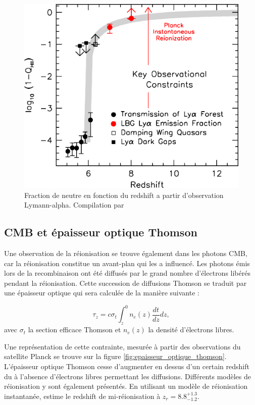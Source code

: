 \begin{figure}
        \includegraphics[width=.95\linewidth]{img/01/xionconstrains.jpg} 
        \caption[Fraction de neutre]{Fraction de neutre en fonction du redshift a partir d'observation Lymann-alpha.
        Compilation par \cite{2015ApJ...811..140B}}
 		\label{fig:compile_constrains}
\end{figure}


\subsection{CMB et épaisseur optique Thomson}

Une observation de la réionisation se trouve également dans les photons \ac{CMB}, car la réionisation constitue un avant-plan qui les a influencé. 
Les photons émis lors de la recombinaison ont été diffusés par le grand nombre d'électrons libérés pendant la réionisation.
Cette succession de diffusions Thomson se traduit par une épaisseur optique qui sera calculée de la manière suivante : 

\begin{equation}
\tau_z = c \sigma_t \int_z^0 n_e (z) \frac{dt}{dz} dz,
\end{equation}
avec $\sigma_t$ la section efficace Thomson et $n_e (z)$ la densité d'électrons libres.

Une représentation de cette contrainte, mesurée à partir des observations du satellite Planck se trouve sur la figure \ref{fig:epaisseur_optique_thomson}.
L'épaisseur optique Thomson cesse d'augmenter en dessus d'un certain redshift du à l’absence d'électrons libres permettant les diffusions.
Différents modèles de réionisation y sont également présentés.
En utilisant un modèle de réionisation instantanée, \cite{planck_collaboration_planck_2016} estime le redshift de mi-réionisation à $z_r = 8.8 ^{+1.3}_{-1.2}$.

